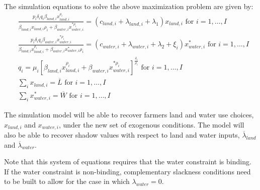 The simulation equations to solve the above maximization problem are given by:
\begin{equation}
\begin{split}
    & \frac { p _ { i } \delta _ { i } q _ { i } \beta _ { land,i } x _ { land,i } ^ { \rho _ { i } } } { \beta _ { land,i } x _ { land,i } \rho _ { i } + \beta _ { water,i } x _ { water,i } ^ { * \rho _ { i } } } = \left( c _ { land,i } + \lambda _ { land,i } + \lambda _ { 1 } \right) x _ { land,i } \text { for } i = 1 , \ldots , I \\
    & \frac { p _ { i } \delta _ { i } q _ { i } \beta _ { water,i } x _ { water,i } ^ { * \rho _ { i } } } { \beta _ { land,i } x _ { land,i } ^ { \rho _ { i } } + \beta _ { water,i } x _ { water,i } ^ { * } \rho _ { i } } = \left( c _ { water,i } + \lambda _ { water,i } + \lambda _ { 2 } + \xi _ { i } \right) x _ { water,i } ^ { * } \text { for } i = 1 , \ldots , I \\
    & q _ { i } = \mu _ { i } \left[ \beta _ { land,i } x _ { land,i } ^ { \rho _ { i } } + \beta _ { water,i } x _ { water,i } ^ { * \rho _ { i } } \right] ^ { \frac { \delta _ { i } } { \rho _ { i } } } \text { for } i = 1 , \ldots , I \\
    & \sum _ { i } x _ { land,i } = \overline { L } \text { for } i = 1 , \ldots , I \\
    & \sum _ { i } x _ { water,i } ^ { * } = \overline { W } \text { for } i = 1 , \ldots , I
\end{split}
\end{equation}

The simulation model will be able to recover farmers land and water use choices, $x_{land,i}$ and $x_{water,i}$, under the new set of exogenous conditions. The model will also be able to recover shadow values with respect to land and water inputs, $\overline{\lambda} _ { land }$ and $\overline{\lambda} _ { water }$.

Note that this system of equations requires that the water constraint is binding. If the water constraint is non-binding, complementary slackness conditions need to be built to allow for the case in which $\lambda _ { water } = 0$.

